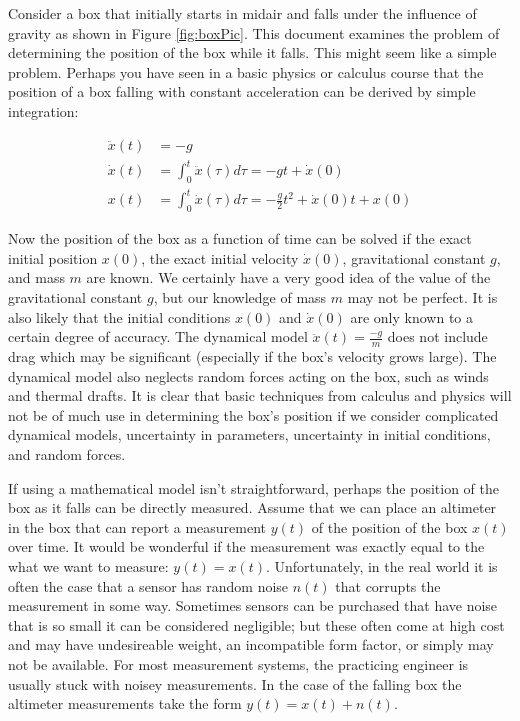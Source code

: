 \documentclass{article}
\begin{document}
Consider a box that initially starts in midair and falls under the influence of gravity as shown in Figure \ref{fig:boxPic}.  This document examines the problem of determining the position of the box while it falls.  This might seem like a simple problem.  Perhaps you have seen in a basic physics or calculus course that the position of a box falling with constant acceleration can be derived by simple integration:

\begin{align}
\label{eq:naiveDynamics}
\ddot{x}(t) &= -g\nonumber\\
\dot{x}(t) 	& =\int_0^t\!\ddot{x}(\tau)d\tau 	= -gt+\dot{x}(0)\nonumber\\
x(t) 		&= \int_0^t\!\dot{x}(\tau)d\tau 	= -\frac{g}{2}t^2+\dot{x}(0)t+x(0)
\end{align}

Now the position of the box as a function of time can be solved if the exact initial position $x(0)$, the exact initial velocity $\dot{x}(0)$, gravitational constant $g$, and mass $m$ are known.  We certainly have a very good idea of the value of the gravitational constant $g$, but our knowledge of mass $m$ may not be perfect.  It is also likely that the initial conditions $x(0)$ and $\dot{x}(0)$ are only known to a certain degree of accuracy.  The dynamical model $\ddot{x}(t)=\frac{-g}{m}$ does not include drag which may be significant (especially if the box's velocity grows large).  The dynamical model also neglects random forces acting on the box, such as winds and thermal drafts.  It is clear that basic techniques from calculus and physics will not be of much use in determining the box's position if we consider complicated dynamical models, uncertainty in parameters, uncertainty in initial conditions, and random forces.  

If using a mathematical model isn't straightforward, perhaps the position of the box as it falls can be directly measured.  Assume that we can place an altimeter in the box that can report a measurement $y(t)$ of the position of the box $x(t)$ over time.  It would be wonderful if the measurement was exactly equal to the what we want to measure: $y(t)=x(t)$.  Unfortunately, in the real world it is often the case that a sensor has random noise $n(t)$ that corrupts the measurement in some way.  Sometimes sensors can be purchased that have noise that is so small it can be considered negligible; but these often come at high cost and may have undesireable weight, an incompatible form factor, or simply may not be available.  For most measurement systems, the practicing engineer is usually stuck with noisey measurements.  In the case of the falling box the altimeter measurements take the form $y(t)=x(t)+n(t)$. 
\end{document}
